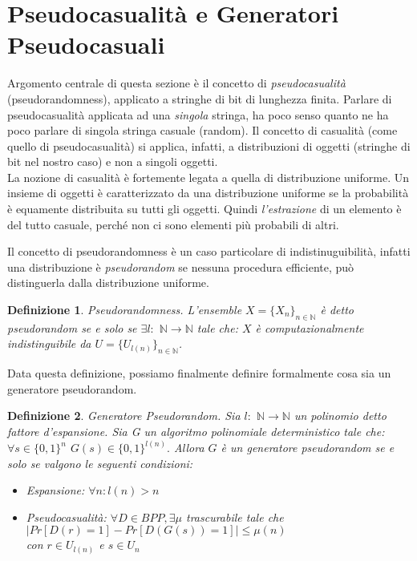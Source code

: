 \documentclass[a4paper,openright,twoside,12pt]{report}
\newtheorem{definizione}{Definizione}[chapter]
\begin{document}
\section{Pseudocasualit\`a e Generatori Pseudocasuali}
Argomento centrale di questa sezione \`e il concetto di \emph{pseudocasualit\`a} (pseudorandomness), applicato a stringhe di bit di lunghezza finita.
Parlare di pseudocasualit\`a applicata ad una \emph{singola} stringa, ha poco senso quanto ne ha poco parlare di singola stringa casuale (random).
Il concetto di casualit\`a (come quello di pseudocasualit\`a) si applica, infatti, a distribuzioni di oggetti (stringhe di bit nel nostro caso) e non a singoli oggetti.\\
La nozione di casualit\`a \`e fortemente legata a quella di distribuzione uniforme. Un insieme di oggetti \`e caratterizzato
da una distribuzione uniforme se la probabilit\`a \`e equamente distribuita su tutti gli oggetti. Quindi \emph{l'estrazione} di un elemento \`e del tutto casuale, 
perch\'e non ci sono elementi pi\`u probabili di altri.

Il concetto di pseudorandomness \`e un caso particolare di indistinuguibilit\`a, infatti una distribuzione \`e \emph{pseudorandom} se nessuna procedura efficiente, 
pu\`o distinguerla dalla distribuzione uniforme.
\begin{definizione}{Pseudorandomness.}
L'ensemble $X=\{X_n\}_{n \in \mathbb{N}}$ \`e detto pseudorandom se e solo se $ \exists l:$ $\mathbb{N}\rightarrow\mathbb{N}$ tale che: 
$X$ \`e computazionalmente indistinguibile da $U=\{U_{l(n)}\}_{n \in \mathbb{N}} $.  
\end{definizione}
Data questa definizione, possiamo finalmente definire formalmente cosa sia un generatore pseudorandom.
\begin{definizione}{Generatore Pseudorandom.}
Sia $l:$ $\mathbb{N}\rightarrow\mathbb{N}$ un polinomio detto fattore d'espansione. 
Sia G un algoritmo polinomiale deterministico tale che: $\forall s \in \{0, 1\}^{n}$ $G(s) \in \{0, 1\}^{l(n)}.$
Allora $G$ \`e un generatore pseudorandom se e solo se valgono le seguenti condizioni:
\begin{itemize}
 \item Espansione: $\forall n: l(n) > n$
 \item Pseudocasualit\`a: $\forall D \in BPP, \exists \mu$ trascurabile tale che \\$\lvert Pr[D(r) = 1] - Pr[D(G(s)) = 1] \rvert \leq \mu(n)$\\con $r \in U_{l(n)}$ e 
$s \in U_{n}$
\end{itemize}
\end{definizione}
\end{document}
